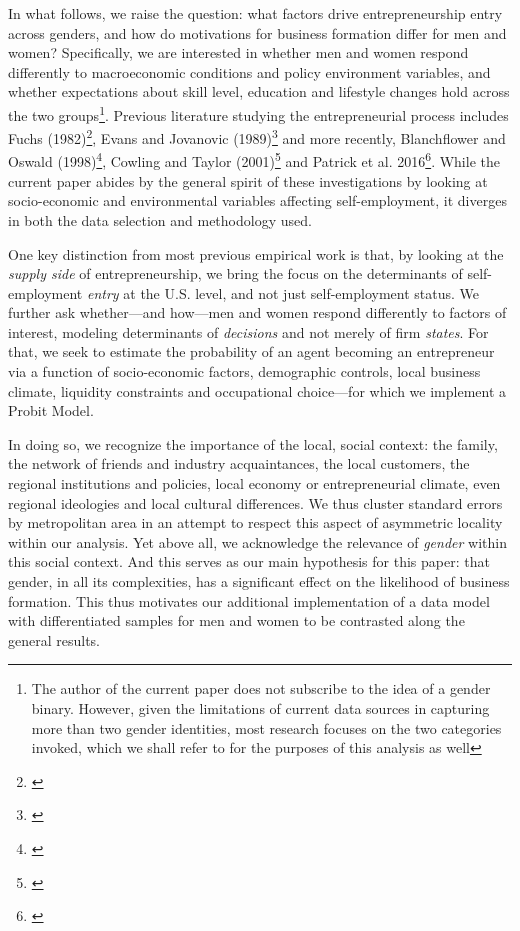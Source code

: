In what follows, we raise the question: what factors drive entrepreneurship entry across genders, and how do motivations for business formation differ for men and women? Specifically, we are interested in whether men and women respond differently to macroeconomic conditions and policy environment variables, and whether expectations about skill level, education and lifestyle changes hold across the two groups\footnote{The author of the current paper does not subscribe to the idea of a gender binary. However, given the limitations of current data sources in capturing more than two gender identities, most research focuses on the two categories invoked, which we shall refer to for the purposes of this analysis as well}. Previous literature studying the entrepreneurial process includes Fuchs (1982)\footnote{\cite{fuchs1980self}}, Evans and Jovanovic (1989)\footnote{\cite{EvansJovanovic1989}} and more recently, Blanchflower and Oswald (1998)\footnote{\cite{BlanchflowerOswald1998}}, Cowling and Taylor (2001)\footnote{\cite{CowlingTaylor2001}} and Patrick et al. 2016\footnote{\cite{PatrickStephensWeinstein2016}}.  While the current paper abides by the general spirit of these investigations by looking at socio-economic and environmental variables affecting self-employment, it diverges in both the data selection and methodology used. 

One key distinction from most previous empirical work is that, by looking at the \textit{supply side} of entrepreneurship, we bring the focus on the determinants of self-employment \textit{entry} at the U.S. level, and not just self-employment status. We further ask whether---and how---men and women respond differently to factors of interest, modeling determinants of \textit{decisions} and not merely of firm \textit{states}. For that, we seek to estimate the probability  of an agent becoming an entrepreneur via a function of socio-economic factors, demographic controls, local business climate, liquidity constraints and occupational choice---for which we implement a Probit Model. 

In doing so, we recognize the importance of the local, social context: the family, the network of friends and industry acquaintances, the local customers, the regional institutions and policies, local economy or entrepreneurial climate, even regional ideologies and local cultural differences. We thus cluster standard errors by metropolitan area in an attempt to respect this aspect of asymmetric locality within our analysis. Yet above all, we acknowledge the relevance of \textit{gender} within this social context. And this serves as our main hypothesis for this paper: that gender, in all its complexities,  has a significant effect on the likelihood of business formation. This thus motivates our additional implementation of a data model with differentiated samples for men and women to be contrasted along the general results. 

